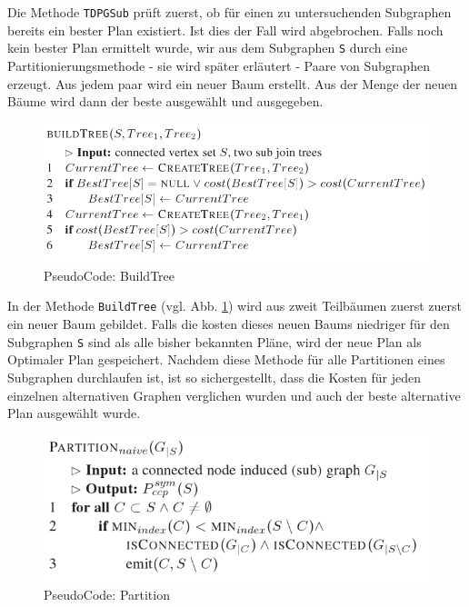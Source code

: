 Die Methode \texttt{TDPGSub} prüft zuerst, ob für einen zu untersuchenden Subgraphen bereits ein bester Plan existiert. Ist dies der Fall wird abgebrochen. Falls noch kein bester Plan ermittelt wurde, wir aus dem Subgraphen \texttt{S} durch eine Partitionierungsmethode - sie wird später erläutert - Paare von Subgraphen erzeugt. Aus jedem paar wird ein neuer Baum erstellt. Aus der Menge der neuen Bäume wird dann der beste ausgewählt und ausgegeben. 


\begin{figure}[ht]
  \centering
  \includegraphics[scale=0.4]{03_Regeln/00_media/BuildTree.png}
  \caption{PseudoCode: BuildTree}
  \label{BuildTree}
\end{figure}

In der Methode \texttt{BuildTree} (vgl. Abb. \ref{BuildTree}) wird aus zweit Teilbäumen zuerst zuerst ein neuer Baum gebildet. Falls die kosten dieses neuen Baums niedriger für den Subgraphen \texttt{S} sind als alle bisher bekannten Pläne, wird der neue Plan als Optimaler Plan gespeichert. Nachdem diese Methode für alle Partitionen eines Subgraphen durchlaufen ist, ist so sichergestellt, dass die Kosten für jeden einzelnen alternativen Graphen verglichen wurden und auch der beste alternative Plan ausgewählt wurde.

\begin{figure}[ht]
  \centering
  \includegraphics[scale=0.4]{03_Regeln/00_media/Partition.png}
  \caption{PseudoCode: Partition}
  \label{Partition}
\end{figure}


